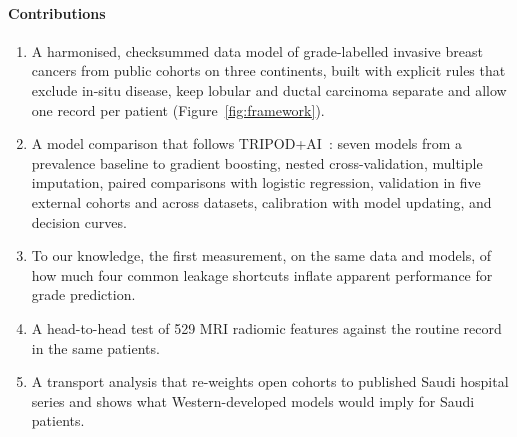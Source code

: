 \paragraph{Contributions}
\begin{enumerate}[leftmargin=*,itemsep=1pt,topsep=2pt]
\item A harmonised, checksummed data model of \NGradedTotal{} grade-labelled invasive breast cancers
from \NGradedCohorts{} public cohorts on three continents, built with explicit rules that exclude
in-situ disease, keep lobular and ductal carcinoma separate and allow one record per patient
(Figure~\ref{fig:framework}).
\item A model comparison that follows TRIPOD+AI~\citep{collins2024tripodai}: seven models from a
prevalence baseline to gradient boosting, nested cross-validation, multiple imputation, paired
comparisons with logistic regression, validation in five external cohorts and across datasets,
calibration with model updating, and decision curves.
\item To our knowledge, the first measurement, on the same data and models, of how much four common leakage
shortcuts inflate apparent performance for grade prediction.
\item A head-to-head test of 529 MRI radiomic features against the routine record in the same
patients.
\item A transport analysis that re-weights open cohorts to published Saudi hospital series and shows
what Western-developed models would imply for Saudi patients.
\end{enumerate}

